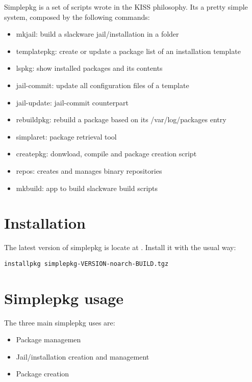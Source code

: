 \documentclass{article}
\begin{document}
Simplepkg is a set of scripts wrote in the KISS philosophy. Its a pretty simple system, composed by the following commands:

\begin{itemize}
   \item mkjail: build a slackware jail/installation in a folder
   \item templatepkg: create or update a package list of an installation template
   \item lspkg: show installed packages and its contents
   \item jail-commit: update all configuration files of a template
   \item jail-update: jail-commit counterpart
   \item rebuildpkg: rebuild a package based on its /var/log/packages entry
   \item simplaret: package retrieval tool
   \item createpkg: donwload, compile and package creation script
   \item repos: creates and manages binary repositories
   \item mkbuild: app to build slackware build scripts
\end{itemize}

\section{Installation}

The latest version of simplepkg is locate at . Install it with the usual way:

\begin{verbatim}
installpkg simplepkg-VERSION-noarch-BUILD.tgz
\end{verbatim}

\section{Simplepkg usage}

The three main simplepkg uses are:

\begin{itemize}
  \item Package managemen
  \item Jail/installation creation and management
  \item Package creation
\end{itemize}
\end{document}
